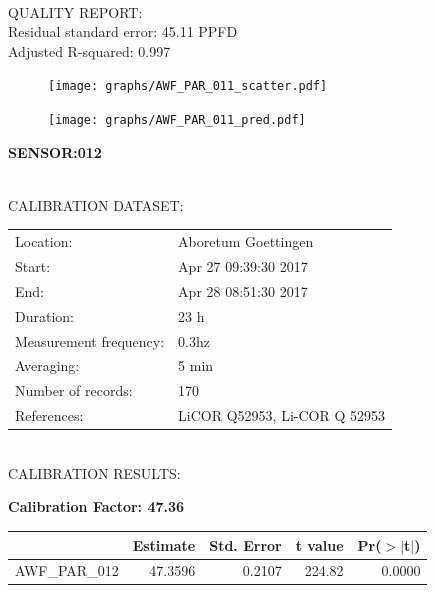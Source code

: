 \documentclass[oneside]{report}
\begin{document}
\hrulefill\\
QUALITY REPORT:\\
Residual standard error: 45.11 PPFD\\
Adjusted R-squared: 0.997



\begin{figure}[H]
  \centering
  \texttt{[image: graphs/AWF\_PAR\_011\_scatter.pdf]}
\end{figure}




\begin{figure}[H]
  \centering
  \texttt{[image: graphs/AWF\_PAR\_011\_pred.pdf]}
\end{figure}

\pagebreak


\begin{center}
\large{\textbf{SENSOR:012}}\\
\end{center}

\hrulefill\\
CALIBRATION DATASET:\\
\begin{table}[h!]
  \centering
  \label{tab:table1}
  \begin{tabular}{ll}
    Location: & Aboretum Goettingen\\ 
    
    
    Start:  & Apr 27 09:39:30 2017 \\
    End:   & Apr 28 08:51:30 2017\\ 
    Duration: & 23 h\\
    Measurement frequency: & 0.3hz\\
    Averaging:  &5 min\\
    Number of records: & 170 \\
    References: & LiCOR Q52953, Li-COR Q 52953 \\
  \end{tabular}
\end{table}

\hrulefill\\
CALIBRATION RESULTS:\\


\begin{center}
\textbf{\large{Calibration Factor: 47.36}}\\
\end{center}
\begin{table}[ht]
\centering
\begin{tabular}{rrrrr}
  \hline
 & Estimate & Std. Error & t value & Pr($>$$|$t$|$) \\ 
  \hline
AWF\_PAR\_012 & 47.3596 & 0.2107 & 224.82 & 0.0000 \\ 
   \hline
\end{tabular}
\end{table}
\end{document}
